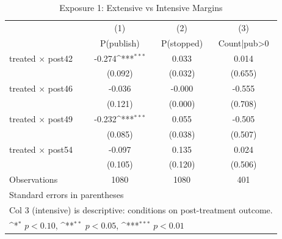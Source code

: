 \begin{table}[htbp]\centering
\def\sym#1{\ifmmode^{#1}\else\(^{#1}\)\fi}
\caption{Exposure 1: Extensive vs Intensive Margins}
\begin{tabular}{l*{3}{c}}
\hline\hline
                    &\multicolumn{1}{c}{(1)}&\multicolumn{1}{c}{(2)}&\multicolumn{1}{c}{(3)}\\
                    &\multicolumn{1}{c}{P(publish)}&\multicolumn{1}{c}{P(stopped)}&\multicolumn{1}{c}{Count|pub>0}\\
\hline
treated $\times$ post42&      -0.274\sym{***}&       0.033         &       0.014         \\
                    &     (0.092)         &     (0.032)         &     (0.655)         \\
[1em]
treated $\times$ post46&      -0.036         &      -0.000         &      -0.555         \\
                    &     (0.121)         &     (0.000)         &     (0.708)         \\
[1em]
treated $\times$ post49&      -0.232\sym{***}&       0.055         &      -0.505         \\
                    &     (0.085)         &     (0.038)         &     (0.507)         \\
[1em]
treated $\times$ post54&      -0.097         &       0.135         &       0.024         \\
                    &     (0.105)         &     (0.120)         &     (0.506)         \\
\hline
Observations        &        1080         &        1080         &         401         \\
\hline\hline
\multicolumn{4}{l}{\footnotesize Standard errors in parentheses}\\
\multicolumn{4}{l}{\footnotesize Col 3 (intensive) is descriptive: conditions on post-treatment outcome.}\\
\multicolumn{4}{l}{\footnotesize \sym{*} \(p<0.10\), \sym{**} \(p<0.05\), \sym{***} \(p<0.01\)}\\
\end{tabular}
\end{table}
